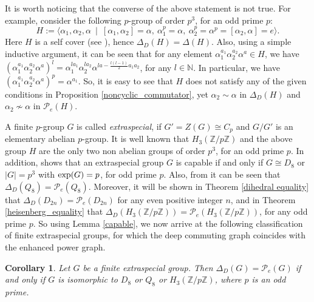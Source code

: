 \documentclass[12pt,a4paper]{article}
\newtheorem{corollary}[theorem]{Corollary}
\begin{document}
It is worth noticing that the converse of the above statement is not true. For example, consider the following $p$-group of order $p^3$, for an odd prime $p$:
\begin{equation}\label{James p group}
 H:=\langle \alpha_1,\alpha_2,\alpha~\mid~[\alpha_1,\alpha_2]=\alpha,~\alpha_1^p=\alpha,~\alpha_2^p=\alpha^p=[\alpha_2,\alpha]=e\rangle.   
\end{equation}
Here $H$ is a self cover (see \cite[Theorem 3.3.6]{karpi}), hence $\Delta_D(H)=\Delta(H)$. Also, using a simple inductive argument, it can be seen that for any element $\alpha_1^{a_1}\alpha_2^{a_2}\alpha^{a}\in H$, we have $(\alpha_1^{a_1}\alpha_2^{a_2}\alpha^{a})^l=\alpha_1^{la_1}\alpha_2^{la_2}\alpha^{la-\frac{l(l-1)}{2}a_1a_2}$, for any $l\in \mathbb{N}$. In particular, we have $(\alpha_1^{a_1}\alpha_2^{a_2}\alpha^{a})^p=\alpha^{a_1}$. So, it is easy to see that $H$ does not satisfy any of the given conditions in Proposition \ref{noncyclic_commutator}, yet $\alpha_2\sim \alpha$ in $\Delta_D(H)$ and $\alpha_2\nsim \alpha$ in $\mathcal{P}_e(H)$.

A finite $p$-group $G$ is called \textit{extraspecial}, if $G'=Z(G)\cong C_p$ and $G/G'$ is an elementary abelian $p$-group. It is well known that $H_3(\mathbb{Z}/p\mathbb{Z})$ and the above group $H$ are the only two non abelian groups of order $p^3$, for an odd prime $p$. In addition, \cite[Corollary 8.2]{beyl} shows that an extraspecial group $G$ is capable if and only if $G\cong D_8$ or $\lvert G\rvert=p^3$ with ${\rm exp}(G)=p$, for odd prime $p$. Also, from \cite[Theorem 30]{aa} it can be seen that $\Delta_D(Q_8)=\mathcal{P}_{e}(Q_8)$. Moreover, it will be shown in Theorem \ref{dihedral equality} that $\Delta_D(D_{2n})=\mathcal{P}_e(D_{2n})$ for any even positive integer $n$, and in Theorem \ref{heisenberg_equality} that $\Delta_D(H_3(\mathbb{Z}/p\mathbb{Z}))=\mathcal{P}_{e}(H_3(\mathbb{Z}/p\mathbb{Z}))$, for any odd prime $p$. So using Lemma \ref{capable}, we now arrive at the following classification of finite extraspecial groups, for which the deep commuting graph coincides with the enhanced power graph.

\begin{corollary}\label{extraspecial}
Let $G$ be a finite extraspecial group. Then $\Delta_D(G)=\mathcal{P}_e(G)$ if and only if $G$ is isomorphic to $D_8$ or $Q_8$ or $H_3(\mathbb{Z}/p\mathbb{Z})$, where $p$ is an odd prime.    
\end{corollary}
\end{document}

